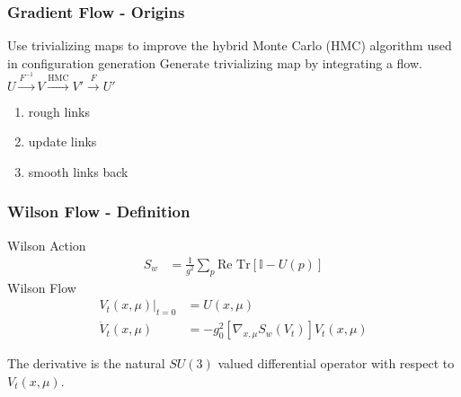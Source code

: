 \begin{frame}
  \addtocounter{framenumber}{-1}
  \frametitle{Gradient Flow - Origins}
  Use trivializing maps to improve the hybrid Monte Carlo (HMC) algorithm used in configuration generation\newline
  \vspace{12pt}
  Generate trivializing map by integrating a flow.
  \newline
  $U \xrightarrow{F^{-1}} V \xrightarrow{\text{HMC}} V' \xrightarrow{F} U'$
  \newline
  \begin{enumerate}
    \item rough links
    \item update links
    \item smooth links back
  \end{enumerate}
\end{frame}

\begin{frame}
  \addtocounter{framenumber}{-1}
  \frametitle{Wilson Flow - Definition}
    Wilson Action
    \begin{align*}
      S_w &= \frac{1}{g^2} \sum\limits_{p}\text{Re }\text{Tr}[\mathbb{I}-U(p)]
    \end{align*}
    Wilson Flow
    \begin{align*}
      V_t(x,\mu)|_{t=0} &= U(x,\mu) \\
      \dot{V}_t(x,\mu) &= -g_0^2[\nabla_{x,\mu}S_w(V_t)]V_t(x,\mu)
    \end{align*}

    The derivative is the natural $SU(3)$ valued differential operator with respect to $V_t(x,\mu)$.
\end{frame}

